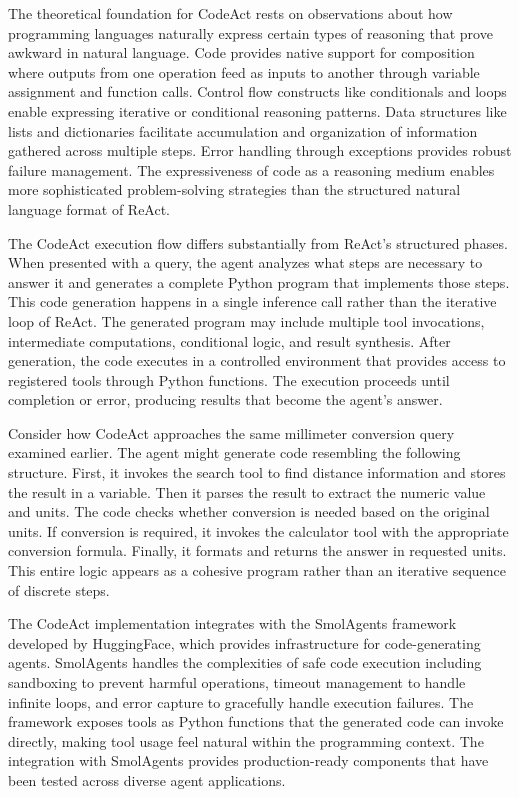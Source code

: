 The theoretical foundation for CodeAct rests on observations about how programming languages naturally express certain types of reasoning that prove awkward in natural language. Code provides native support for composition where outputs from one operation feed as inputs to another through variable assignment and function calls. Control flow constructs like conditionals and loops enable expressing iterative or conditional reasoning patterns. Data structures like lists and dictionaries facilitate accumulation and organization of information gathered across multiple steps. Error handling through exceptions provides robust failure management. The expressiveness of code as a reasoning medium enables more sophisticated problem-solving strategies than the structured natural language format of ReAct.

The CodeAct execution flow differs substantially from ReAct's structured phases. When presented with a query, the agent analyzes what steps are necessary to answer it and generates a complete Python program that implements those steps. This code generation happens in a single inference call rather than the iterative loop of ReAct. The generated program may include multiple tool invocations, intermediate computations, conditional logic, and result synthesis. After generation, the code executes in a controlled environment that provides access to registered tools through Python functions. The execution proceeds until completion or error, producing results that become the agent's answer.

Consider how CodeAct approaches the same millimeter conversion query examined earlier. The agent might generate code resembling the following structure. First, it invokes the search tool to find distance information and stores the result in a variable. Then it parses the result to extract the numeric value and units. The code checks whether conversion is needed based on the original units. If conversion is required, it invokes the calculator tool with the appropriate conversion formula. Finally, it formats and returns the answer in requested units. This entire logic appears as a cohesive program rather than an iterative sequence of discrete steps.

The CodeAct implementation integrates with the SmolAgents framework developed by HuggingFace, which provides infrastructure for code-generating agents. SmolAgents handles the complexities of safe code execution including sandboxing to prevent harmful operations, timeout management to handle infinite loops, and error capture to gracefully handle execution failures. The framework exposes tools as Python functions that the generated code can invoke directly, making tool usage feel natural within the programming context. The integration with SmolAgents provides production-ready components that have been tested across diverse agent applications.

